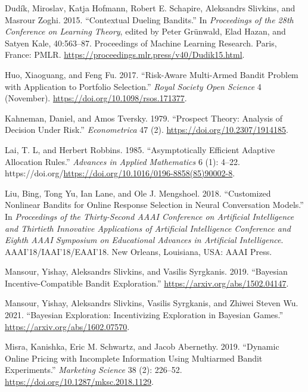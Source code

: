 \documentclass[
  letterpaper,
  numbers=noenddot,
  DIV=11,
  oneside]{scrreprt}
\newlength{\cslhangindent}
\newenvironment{CSLReferences}[2] %
 {\begin{list}{}{%
  \setlength{\itemindent}{0pt}
  \setlength{\leftmargin}{0pt}
  \setlength{\parsep}{0pt}
  \ifodd #1
   \setlength{\leftmargin}{\cslhangindent}
   \setlength{\itemindent}{-1\cslhangindent}
  \fi
  \setlength{\itemsep}{#2\baselineskip}}}
 {\end{list}}
\theoremstyle{remark}
\begin{document}
\begin{CSLReferences}{1}{0}
Dudík, Miroslav, Katja Hofmann, Robert E. Schapire, Aleksandrs Slivkins,
and Masrour Zoghi. 2015. {``Contextual Dueling Bandits.''} In
\emph{Proceedings of the 28th Conference on Learning Theory}, edited by
Peter Grünwald, Elad Hazan, and Satyen Kale, 40:563--87. Proceedings of
Machine Learning Research. Paris, France: PMLR.
\url{https://proceedings.mlr.press/v40/Dudik15.html}.

Huo, Xiaoguang, and Feng Fu. 2017. {``Risk-Aware Multi-Armed Bandit
Problem with Application to Portfolio Selection.''} \emph{Royal Society
Open Science} 4 (November). \url{https://doi.org/10.1098/rsos.171377}.

Kahneman, Daniel, and Amos Tversky. 1979. {``Prospect Theory: Analysis
of Decision Under Risk.''} \emph{Econometrica} 47 (2).
\url{https://doi.org/10.2307/1914185}.

Lai, T. L, and Herbert Robbins. 1985. {``Asymptotically Efficient
Adaptive Allocation Rules.''} \emph{Advances in Applied Mathematics} 6
(1): 4--22.
https://doi.org/\url{https://doi.org/10.1016/0196-8858(85)90002-8}.

Liu, Bing, Tong Yu, Ian Lane, and Ole J. Mengshoel. 2018. {``Customized
Nonlinear Bandits for Online Response Selection in Neural Conversation
Models.''} In \emph{Proceedings of the Thirty-Second AAAI Conference on
Artificial Intelligence and Thirtieth Innovative Applications of
Artificial Intelligence Conference and Eighth AAAI Symposium on
Educational Advances in Artificial Intelligence}.
AAAI'18/IAAI'18/EAAI'18. New Orleans, Louisiana, USA: AAAI Press.

Mansour, Yishay, Aleksandrs Slivkins, and Vasilis Syrgkanis. 2019.
{``Bayesian Incentive-Compatible Bandit Exploration.''}
\url{https://arxiv.org/abs/1502.04147}.

Mansour, Yishay, Aleksandrs Slivkins, Vasilis Syrgkanis, and Zhiwei
Steven Wu. 2021. {``Bayesian Exploration: Incentivizing Exploration in
Bayesian Games.''} \url{https://arxiv.org/abs/1602.07570}.

Misra, Kanishka, Eric M. Schwartz, and Jacob Abernethy. 2019. {``Dynamic
Online Pricing with Incomplete Information Using Multiarmed Bandit
Experiments.''} \emph{Marketing Science} 38 (2): 226--52.
\url{https://doi.org/10.1287/mksc.2018.1129}.


\end{CSLReferences}
\end{document}
